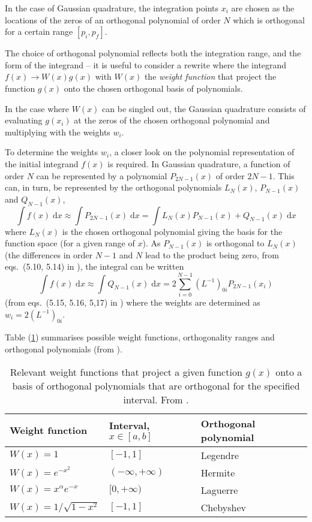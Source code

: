 \documentclass[a4paper,11pt]{article}
\newcommand{\diff}{\ensuremath{\; \text{d}}}
\begin{document}
In the case of Gaussian quadrature, the integration points $x_i$ are chosen as the locations of the zeros of an orthogonal polynomial of order $N$ which is orthogonal for a certain range $[p_i, p_f]$.  

The choice of orthogonal polynomial reflects both the integration range, and the form of the integrand -- it is useful to consider a rewrite where the integrand $f(x) \to W(x) g(x)$ with $W(x)$ the \textit{weight function} that project the function $g(x)$ onto the chosen orthogonal basis of polynomials. 

In the case where $W(x)$ can be singled out, the Gaussian quadrature consists of evaluating $g(x_i)$ at the zeros of the chosen orthogonal polynomial and multiplying with the weights $w_i$.

To determine the weights $w_i$, a closer look on the polynomial representation of the initial integrand $f(x)$ is required. In Gaussian quadrature, a function of order $N$ can be represented by a polynomial $P_{2N-1}(x)$ of order $2N-1$. This can, in turn, be represented by the orthogonal polynomials $L_N(x)$, $P_{N-1}(x)$ and $Q_{N-1}(x)$,
\begin{equation}
    \int f(x) \diff x \approx \int P_{2N-1}(x) \diff x = \int L_N(x) P_{N-1}(x) + Q_{N-1}(x) \diff x
    \label{eq:quadrature}
\end{equation}
where $L_N(x)$ is the chosen orthogonal polynomial giving the basis for the function space (for a given range of $x$). As $P_{N-1}(x)$ is orthogonal to $L_N(x)$ (the differences in order $N-1$ and $N$ lead to the product being zero, from eqs.~(5.10, 5.14) in \cite{MHJ:2013}), the integral can be written
\[ \int f(x) \diff x \approx \int Q_{N-1}(x) \diff x = 2 \sum_{i=0}^{N-1} \left( L^{-1} \right)_{0i} P_{2N-1}(x_i) \]
(from eqs.~(5.15, 5.16, 5,17) in \cite{MHJ:2013}) where the weights are determined as $w_i = 2 \left( L^{-1} \right)_{0i}$.

Table (\ref{tab:polys}) summarises possible weight functions, orthogonality ranges and orthogonal polynomials (from \cite{MHJ:2013}).

\begin{table}
    \centering
    \caption{Relevant weight functions that project a given function $g(x)$ onto a basis of orthogonal polynomials that are orthogonal for the specified interval. From \cite{MHJ:2013}.}
    \begin{tabular}{l l l}
        \hline 
        Weight function & Interval, $x\in[a,b]$ & Orthogonal polynomial \\
        \hline
        $W(x) = 1$          & $[-1,1]$              & Legendre \\
        $W(x) = e^{-x^2}$   & $(-\infty, +\infty)$  & Hermite \\
        $W(x) = x^\alpha e^{-x}$ & $[0, +\infty)$   & Laguerre \\
        $W(x) = 1/\sqrt{1 - x^2}$& $[-1, 1]$        & Chebyshev \\
        \hline
    \end{tabular}
    \label{tab:polys}
\end{table}
\end{document}
